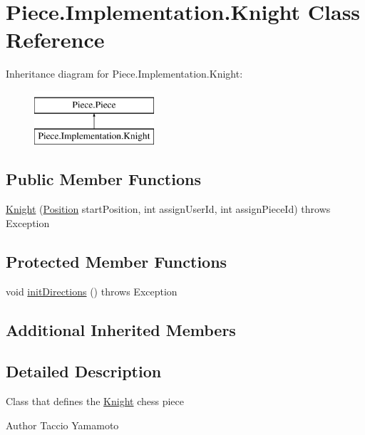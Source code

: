 \hypertarget{classPiece_1_1Implementation_1_1Knight}{\section{Piece.\-Implementation.\-Knight Class Reference}
\label{classPiece_1_1Implementation_1_1Knight}
}
Inheritance diagram for Piece.\-Implementation.\-Knight\-:\begin{figure}[H]
\begin{center}
\leavevmode
\includegraphics[height=2.000000cm]{classPiece_1_1Implementation_1_1Knight}
\end{center}
\end{figure}
\subsection*{Public Member Functions}
\begin{DoxyCompactItemize}
\item 
\hyperlink{classPiece_1_1Implementation_1_1Knight_a030cb62a535ccf809b9bb4c6f6a10daa}{Knight} (\hyperlink{classUtil_1_1Position}{Position} start\-Position, int assign\-User\-Id, int assign\-Piece\-Id)  throws Exception 
\end{DoxyCompactItemize}
\subsection*{Protected Member Functions}
\begin{DoxyCompactItemize}
\item 
void \hyperlink{classPiece_1_1Implementation_1_1Knight_a06194dc37dbf065c81f6432a4ea18103}{init\-Directions} ()  throws Exception 
\end{DoxyCompactItemize}
\subsection*{Additional Inherited Members}


\subsection{Detailed Description}
Class that defines the \hyperlink{classPiece_1_1Implementation_1_1Knight}{Knight} chess piece \begin{DoxyAuthor}{Author}
Taccio Yamamoto 
\end{DoxyAuthor}


